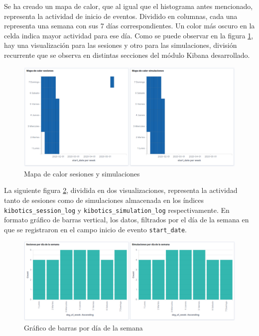 \documentclass[11pt,a4paper]{book}
\begin{document}
				Se ha creado un mapa de calor, que al igual que el histograma antes mencionado, representa la actividad de inicio de eventos. Dividido en columnas, cada una representa una semana con sus 7 días correspondientes. Un color más oscuro en la celda indica mayor actividad para ese día. Como se puede observar en la figura \ref{fig:kibana_heatmap}, hay una visualización para las sesiones y otro para las simulaciones, división recurrente que se observa en distintas secciones del módulo Kibana desarrollado.
				\begin{figure}[H]
					\centering
					\includegraphics[width=13cm, keepaspectratio]{img/kibana_02_heatMap}
					\caption{Mapa de calor sesiones y simulaciones}
					\label{fig:kibana_heatmap}
				\end{figure}

				La siguiente figura \ref{fig:kibana_dayofweek}, dividida en dos visualizaciones, representa la actividad tanto de sesiones como de simulaciones almacenada en los índices \texttt{kibotics\_session\_log} y \texttt{kibotics\_simulation\_log} respectivamente. En formato gráfico de barras vertical, los datos, filtrados por el día de la semana en que se registraron en el campo inicio de evento \texttt{start\_date}. \\
				
				\begin{figure}[H]
					\centering
					\includegraphics[width=14cm, keepaspectratio]{img/kibana_03_day_of_week}
					\caption{Gráfico de barras por día de la semana}
					\label{fig:kibana_dayofweek}
				\end{figure}
\end{document}
